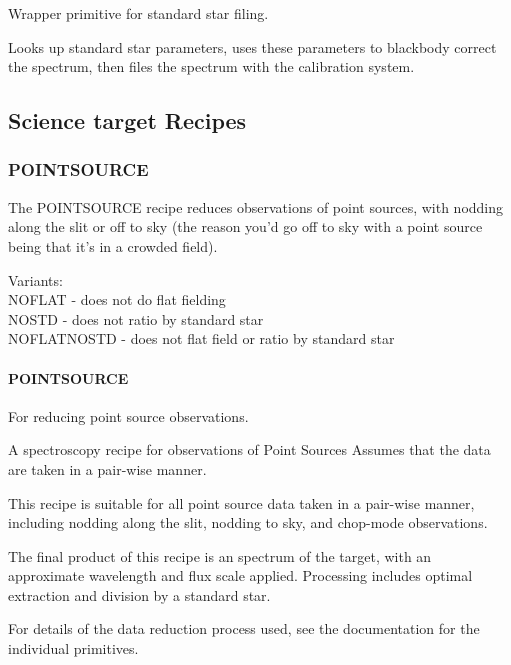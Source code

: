 \documentclass[twoside,11pt]{article}
\renewcommand{\_}{\texttt{\symbol{95}}}
\begin{document}
Wrapper primitive for standard star filing.


\mbox{}


Looks up standard star parameters, uses these parameters to blackbody
correct the spectrum, then files the spectrum with the calibration system.


\subsection{Science target Recipes}

\subsubsection{POINT\_SOURCE}

The POINT\_SOURCE recipe reduces observations of point sources, with
nodding along the slit or off to sky (the reason you'd go off to sky
with a point source being that it's in a crowded field).


Variants: \\
\_NOFLAT - does not do flat fielding \\
\_NOSTD - does not ratio by standard star \\
\_NOFLAT\_NOSTD - does not flat field or ratio by standard star \\

\paragraph{POINT\_SOURCE\label{POINT_SOURCE}}


For reducing point source observations.


\mbox{}


A spectroscopy recipe for observations of Point Sources
Assumes that the data are taken in a pair-wise manner.



This recipe is suitable for all point source data taken in a pair-wise
manner, including nodding along the slit, nodding to sky, and
chop-mode observations.



The final product of this recipe is an spectrum of the target, with an
approximate wavelength and flux scale applied. Processing includes
optimal extraction and division by a standard star.



For details of the data reduction process used, see the documentation
for the individual primitives.
\end{document}
